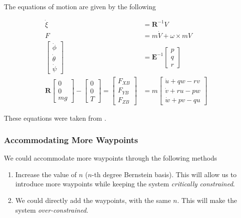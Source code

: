 The equations of motion are given by the following

\begin{align*}
    \dot{\xi} &= \mathbf{R}^{-1} V \\
    F &= m \dot{V} + \omega \times mV \\
    \begin{bmatrix}
        \dot{\phi} \\ \dot{\theta} \\ \dot{\psi}
    \end{bmatrix} &= \mathbf{E}^{-1} \begin{bmatrix}
        p \\ q \\ r
    \end{bmatrix} \\
    \mathbf{R} \begin{bmatrix}
        0 \\ 0 \\ mg
    \end{bmatrix} - \begin{bmatrix}
        0 \\ 0 \\ T
    \end{bmatrix} = \begin{bmatrix}
        F_{XB} \\ F_{YB} \\ F_{ZB}
    \end{bmatrix} &= m \begin{bmatrix}
        \dot{u} + qw - rv \\
        \dot{v} + ru - pw \\
        \dot{w} + pv - qu
    \end{bmatrix}
\end{align*}

These equations were taken from \cite{vilez2015trajectory}.

\subsubsection{Accommodating More Waypoints}

We could accommodate more waypoints through the following methods

\begin{enumerate}
    \item Increase the value of $n$ ($n$-th degree Bernstein basis). This will allow us to introduce more waypoints while keeping the system \emph{critically constrained}.
    \item We could directly add the waypoints, with the same $n$. This will make the system \emph{over-constrained}.
\end{enumerate}

